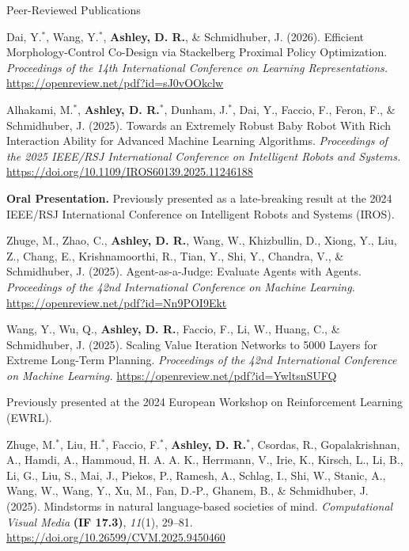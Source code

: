 \documentclass[a4paper,dateabbrev]{cv}
\begin{document}
\begin{rSection}{Peer-Reviewed Publications}

\begin{rPublications}
    \item \label{pub:dai2025efficient}
        Dai, Y.$^*$, Wang, Y.$^*$, \textbf{Ashley, D. R.}, \& Schmidhuber, J.
        (2026).
        Efficient Morphology-Control Co-Design via Stackelberg Proximal Policy Optimization.
        \textit{Proceedings of the 14th International Conference on Learning Representations.}
        \url{https://openreview.net/pdf?id=sJ0vOOkclw}
    \item \label{pub:alhakami2025towards}
        Alhakami, M.$^*$, \textbf{Ashley, D. R.}$^*$, Dunham, J.$^*$, Dai, Y., Faccio, F., Feron, F., \& Schmidhuber, J.
        (2025).
        Towards an Extremely Robust Baby Robot With Rich Interaction Ability for Advanced Machine Learning Algorithms.
        \textit{Proceedings of the 2025 IEEE/RSJ International Conference on Intelligent Robots and Systems.}
        \url{https://doi.org/10.1109/IROS60139.2025.11246188}

        \nopagebreak\vspace{-0.4em}\nopagebreak
        \textbf{Oral Presentation.}
        Previously presented as a late-breaking result at the 2024 IEEE/RSJ International Conference on Intelligent Robots and Systems (IROS).
    \item \label{pub:zhuge2024agent}
        Zhuge, M., Zhao, C., \textbf{Ashley, D. R.}, Wang, W., Khizbullin, D., Xiong, Y., Liu, Z., Chang, E., Krishnamoorthi, R., Tian, Y., Shi, Y., Chandra, V., \& Schmidhuber, J.
        (2025).
        Agent-as-a-Judge: Evaluate Agents with Agents.
        \textit{Proceedings of the 42nd International Conference on Machine Learning.}
        \url{https://openreview.net/pdf?id=Nn9POI9Ekt}
    \item \label{pub:wang2024scaling}
        Wang, Y., Wu, Q., \textbf{Ashley, D. R.}, Faccio, F., Li, W., Huang, C., \& Schmidhuber, J.
        (2025).
        Scaling Value Iteration Networks to 5000 Layers for Extreme Long-Term Planning.
        \textit{Proceedings of the 42nd International Conference on Machine Learning.}
        \url{https://openreview.net/pdf?id=YwltsnSUFQ}

        \nopagebreak\vspace{-0.4em}\nopagebreak
        Previously presented at the 2024 European Workshop on Reinforcement Learning (EWRL).
    \item \label{pub:zhuge2025mindstorms}
        Zhuge, M.$^*$, Liu, H.$^*$, Faccio, F.$^*$, \textbf{Ashley, D. R.}$^*$, Csordas, R., Gopalakrishnan, A., Hamdi, A., Hammoud, H. A. A. K., Herrmann, V., Irie, K., Kirsch, L., Li, B., Li, G., Liu, S., Mai, J., Piekos, P., Ramesh, A., Schlag, I., Shi, W., Stanic, A., Wang, W., Wang, Y., Xu, M., Fan, D.-P., Ghanem, B., \& Schmidhuber, J.
        (2025).
        Mindstorms in natural language-based societies of mind.
        \textit{Computational Visual Media} \textbf{(IF 17.3)}, \textit{11}(1), 29--81.
        \url{https://doi.org/10.26599/CVM.2025.9450460}


\end{rPublications}
\end{rSection}
\end{document}
